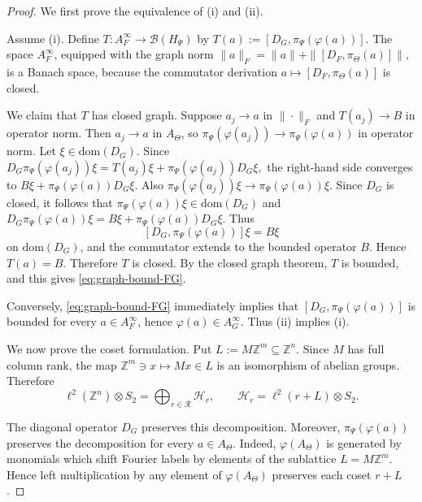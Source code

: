\documentclass[11pt]{amsart}
\theoremstyle{definition}
\theoremstyle{remark}
\newcommand{\Z}{\mathbb{Z}}
\newcommand{\dom}{\mathrm{dom}}
\begin{document}
\begin{proof}
We first prove the equivalence of \textup{(i)} and \textup{(ii)}.

Assume \textup{(i)}. Define $T\colon A_F^\infty\to \mathcal B(H_\Psi)$ by $T(a):=[D_G,\pi_\Psi(\varphi(a))].$ 
The space $A_F^\infty$, equipped with the graph norm $\|a\|_F=\|a\|+\|[D_F,\pi_\Theta(a)]\|,$
is a Banach space, because the commutator derivation
$a\mapsto [D_F,\pi_\Theta(a)]$ is closed.

We claim that $T$ has closed graph. Suppose $a_j\to a$ in $\|\cdot\|_F$
and $T(a_j)\to B$ in operator norm. Then $a_j\to a$ in $A_\Theta$, so $\pi_\Psi(\varphi(a_j))\to \pi_\Psi(\varphi(a))$
in operator norm. Let \(\xi\in\dom(D_G)\). Since $D_G\pi_\Psi(\varphi(a_j))\xi=T(a_j)\xi+\pi_\Psi(\varphi(a_j))D_G\xi,$
the right-hand side converges to $B\xi+\pi_\Psi(\varphi(a))D_G\xi.$
Also $\pi_\Psi(\varphi(a_j))\xi\to \pi_\Psi(\varphi(a))\xi.$
Since $D_G$ is closed, it follows that
$\pi_\Psi(\varphi(a))\xi\in\dom(D_G)$
and $D_G\pi_\Psi(\varphi(a))\xi=B\xi+\pi_\Psi(\varphi(a))D_G\xi.$
Thus
\[
[D_G,\pi_\Psi(\varphi(a))]\xi=B\xi
\]
on $\dom(D_G)$, and the commutator extends to the bounded operator $B$.
Hence $T(a)=B$. Therefore $T$ is closed. By the closed graph theorem,
$T$ is bounded, and this gives \eqref{eq:graph-bound-FG}.

Conversely, \eqref{eq:graph-bound-FG} immediately implies that $[D_G,\pi_\Psi(\varphi(a))]$
is bounded for every $a\in A_F^\infty$, hence $\varphi(a)\in A_G^\infty.$
Thus \textup{(ii)} implies \textup{(i)}.

We now prove the coset formulation. Put $L:=M\Z^m\subseteq \Z^n.$
Since $M$ has full column rank, the map
$\Z^m\ni x\mapsto Mx \in L$ 
is an isomorphism of abelian groups. Therefore 
\[
\ell^2(\Z^n)\otimes S_2
=
\bigoplus_{r\in\mathcal R}\mathcal H_r,
\qquad
\mathcal H_r=\ell^2(r+L)\otimes S_2.
\]


The diagonal operator $D_G$ preserves this decomposition. Moreover,
$\pi_\Psi(\varphi(a))$ preserves the decomposition for every
$a\in A_\Theta$. Indeed, $\varphi(A_\Theta)$ is generated by monomials
which shift Fourier labels by elements of the sublattice $L=M\Z^m$. Hence
left multiplication by any element of $\varphi(A_\Theta)$ preserves each
coset $r+L$.


\end{proof}
\end{document}
